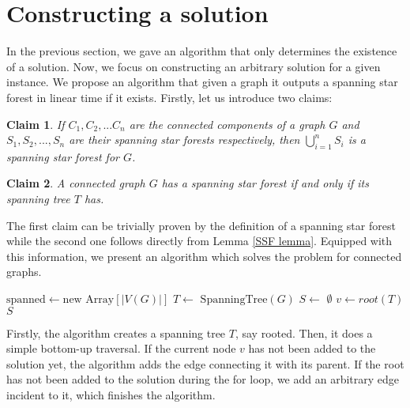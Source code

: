 \documentclass[en]{pracamgr}
\newtheorem{claim}{Claim}
\theoremstyle{definition}
\newcommand{\ssf}{spanning star forest}
\begin{document}
\section{Constructing a solution}

In the previous section, we gave an algorithm that only determines the existence of a solution. Now, we focus on constructing an arbitrary solution for a given instance. We propose an algorithm that given a graph it outputs a spanning star forest in linear time if it exists. Firstly, let us introduce two claims:

\begin{claim} \label{SSF sum}
	If $C_1,C_2,...C_n$ are the connected components of a graph $G$ and $S_1,S_2,...,S_n$ are their \ssf{}s respectively, then $\bigcup\limits_{i=1}^n S_i$ is a \ssf{} for $G$.
\end{claim}

\begin{claim} \label{Spanning tree SSF}
	A connected graph $G$ has a \ssf{} if and only if its spanning tree $T$ has.
\end{claim}

The first claim can be trivially proven by the definition of a \ssf{} while the second one follows directly from Lemma \ref{SSF lemma}. Equipped with this information, we present an algorithm which solves the problem for connected graphs.

\begin{algorithm}\label{alg1}
	\KwOut{\ssf{} of $G$}
	$\textrm{spanned} \leftarrow \textrm{new Array}[|V(G)|]$\;
	$T \leftarrow$ $\textrm{SpanningTree}(G)$\;
	$S \leftarrow$ $\emptyset$\;
	$v \leftarrow root(T)$\;
	\Return $S$\;
	\caption{Obtaining a spanning star forest from a connected graph.}
\end{algorithm}

Firstly, the algorithm creates a spanning tree $T$, say rooted. Then, it does a simple bottom-up traversal. If the current node $v$ has not been added to the solution yet, the algorithm adds the edge connecting it with its parent. If the root has not been added to the solution during the for loop, we add an arbitrary edge incident to it, which finishes the algorithm.
\end{document}
